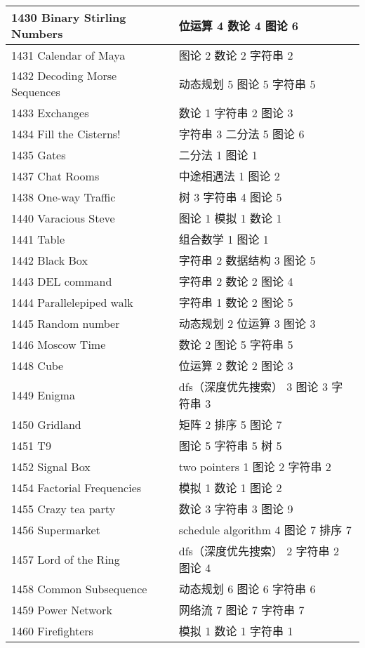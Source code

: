 \begin{longtable}{| p{} | p{} |}
 1430 Binary Stirling Numbers  & 位运算 4 数论 4 图论 6 \\ \hline
 1431 Calendar of Maya  & 图论 2 数论 2 字符串 2 \\ \hline
 1432 Decoding Morse Sequences  & 动态规划 5 图论 5 字符串 5 \\ \hline
 1433 Exchanges  & 数论 1 字符串 2 图论 3 \\ \hline
 1434 Fill the Cisterns!  & 字符串 3 二分法 5 图论 6 \\ \hline
 1435 Gates  & 二分法 1 图论 1 \\ \hline
 1437 Chat Rooms  & 中途相遇法 1 图论 2 \\ \hline
 1438 One-way Traffic  & 树 3 字符串 4 图论 5 \\ \hline
 1440 Varacious Steve  & 图论 1 模拟 1 数论 1 \\ \hline
 1441 Table  & 组合数学 1 图论 1 \\ \hline
 1442 Black Box  & 字符串 2 数据结构 3 图论 5 \\ \hline
 1443 DEL command  & 字符串 2 数论 2 图论 4 \\ \hline
 1444 Parallelepiped walk  & 字符串 1 数论 2 图论 5 \\ \hline
 1445 Random number  & 动态规划 2 位运算 3 图论 3 \\ \hline
 1446 Moscow Time  & 数论 2 图论 5 字符串 5 \\ \hline
 1448 Cube  & 位运算 2 数论 2 图论 3 \\ \hline
 1449 Enigma  & dfs（深度优先搜索） 3 图论 3 字符串 3 \\ \hline
 1450 Gridland  & 矩阵 2 排序 5 图论 7 \\ \hline
 1451 T9  & 图论 5 字符串 5 树 5 \\ \hline
 1452 Signal Box  & two pointers 1 图论 2 字符串 2 \\ \hline
 1454 Factorial Frequencies  & 模拟 1 数论 1 图论 2 \\ \hline
 1455 Crazy tea party  & 数论 3 字符串 3 图论 9 \\ \hline
 1456 Supermarket  & schedule algorithm 4 图论 7 排序 7 \\ \hline
 1457 Lord of the Ring  & dfs（深度优先搜索） 2 字符串 2 图论 4 \\ \hline
 1458 Common Subsequence  & 动态规划 6 图论 6 字符串 6 \\ \hline
 1459 Power Network  & 网络流 7 图论 7 字符串 7 \\ \hline
 1460 Firefighters  & 模拟 1 数论 1 字符串 1 \\ \hline

\end{longtable}
